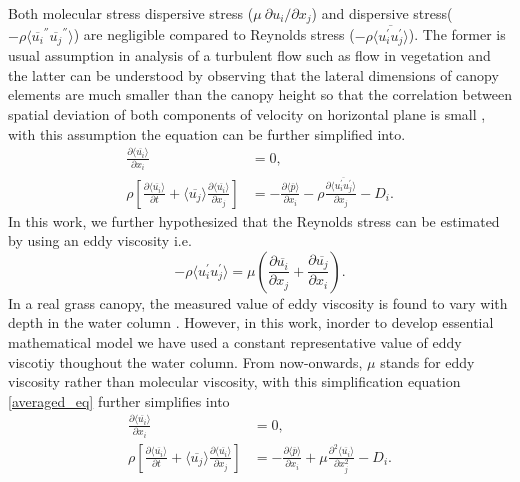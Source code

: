 \documentclass[12pt]{report}   %
\newcommand{\del}{\partial}
\renewcommand{\bar}{\overline}
\begin{document}
 Both molecular stress dispersive stress ($ \mu\ \del u_i / \del x_j $) and dispersive stress($-\rho \langle \bar{u_i}^{''} \bar{u_j}^{''} \rangle $) are negligible compared to Reynolds stress ($-\rho \langle\bar{ u_i^{'} u_j^{'} } \rangle $). The former is usual assumption in analysis of a turbulent flow such as flow in vegetation and the latter can be understood by observing that the
 lateral dimensions of canopy elements are much smaller than the canopy height so that the correlation between spatial deviation of both components of velocity on horizontal plane is small \cite{Raupach94,Raupach96}, with this assumption the equation can be further simplified into.
 \begin{equation}\label{averaged_eq2}
  \begin{split}
  \frac{\partial \langle \bar{u_i} \rangle}{\partial x_i}&=0 ,\\
 \rho \left[ \frac{\partial \langle \overline{u_i} \rangle }{\partial t}+ \langle \overline{u_j} \rangle \frac{\partial \langle \bar{u_i} \rangle}{\partial x_j} \right ] &= -\frac{\partial \langle \bar{p} \rangle  }{\partial x_i} -\rho \frac{\partial \langle \bar{u_i^{'}u_j^{'}} \rangle }{\partial x_j} -D_i .
 \end{split}
\end{equation}
In this work, we further hypothesized that the Reynolds stress can be estimated by using an eddy viscosity i.e. 
\[ -\rho \langle u_i^{'} u_j^{'} \rangle = \mu \left(\frac{\del \bar{u_i} }{\del x_j} + \frac{\del \bar {u_j} }{\del x_i}  \right) .\]
In a real grass canopy, the measured value of eddy viscosity is found to vary with depth in the water column \cite{Nepf04}. However, in this work, inorder to develop essential mathematical model we have used a constant representative value of eddy viscotiy thoughout the water column.
From now-onwards, $\mu$ stands for eddy viscosity rather than molecular viscosity, with this simplification equation \ref{averaged_eq} further simplifies into
 \begin{equation}\label{averaged_eq3}
  \begin{split}
  \frac{\partial \langle \bar{u_i} \rangle}{\partial x_i}&=0, \\
 \rho \left[ \frac{\partial \langle \overline{u_i} \rangle }{\partial t}+ \langle \overline{u_j} \rangle \frac{\partial \langle \bar{u_i} \rangle}{\partial x_j} \right ] &= -\frac{\partial \langle \bar{p} \rangle  }{\partial x_i} +\mu \frac{\partial^2 \langle \bar{u_i} \rangle }{\partial x_j^2} - D_i .
 \end{split}
\end{equation}
\end{document}
